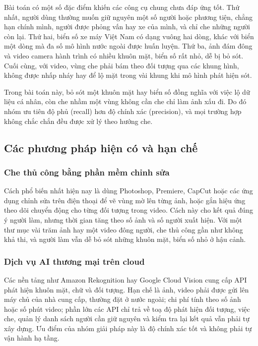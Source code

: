 \documentclass[a4paper,12pt]{article}
\begin{document}
Bài toán có một số đặc điểm khiến các công cụ chung chưa đáp ứng tốt. Thứ nhất, người dùng thường muốn giữ nguyên một số người hoặc phương tiện, chẳng hạn chính mình, người được phỏng vấn hay xe của mình, và chỉ che những người còn lại. Thứ hai, biển số xe máy Việt Nam có dạng vuông hai dòng, khác với biển một dòng mà đa số mô hình nước ngoài được huấn luyện. Thứ ba, ảnh đám đông và video camera hành trình có nhiều khuôn mặt, biển số rất nhỏ, dễ bị bỏ sót. Cuối cùng, với video, vùng che phải bám theo đối tượng qua các khung hình, không được nhấp nháy hay để lộ mặt trong vài khung khi mô hình phát hiện sót.

Trong bài toán này, bỏ sót một khuôn mặt hay biển số đồng nghĩa với việc lộ dữ liệu cá nhân, còn che nhầm một vùng không cần che chỉ làm ảnh xấu đi. Do đó nhóm ưu tiên độ phủ (recall) hơn độ chính xác (precision), và mọi trường hợp không chắc chắn đều được xử lý theo hướng che.


\subsection{Các phương pháp hiện có và hạn chế}


\subsubsection{Che thủ công bằng phần mềm chỉnh sửa}

Cách phổ biến nhất hiện nay là dùng Photoshop, Premiere, CapCut hoặc các ứng dụng chỉnh sửa trên điện thoại để vẽ vùng mờ lên từng ảnh, hoặc gắn hiệu ứng theo dõi chuyển động cho từng đối tượng trong video. Cách này cho kết quả đúng ý người làm, nhưng thời gian tăng theo số ảnh và số người xuất hiện. Với một thư mục vài trăm ảnh hay một video đông người, che thủ công gần như không khả thi, và người làm vẫn dễ bỏ sót những khuôn mặt, biển số nhỏ ở hậu cảnh.


\subsubsection{Dịch vụ AI thương mại trên cloud}

Các nền tảng như Amazon Rekognition hay Google Cloud Vision cung cấp API phát hiện khuôn mặt, chữ và đối tượng. Hạn chế là ảnh, video phải được gửi lên máy chủ của nhà cung cấp, thường đặt ở nước ngoài; chi phí tính theo số ảnh hoặc số phút video; phần lớn các API chỉ trả về toạ độ phát hiện đối tượng, việc che, quản lý danh sách người cần giữ nguyên và kiểm tra lại kết quả vẫn phải tự xây dựng. Ưu điểm của nhóm giải pháp này là độ chính xác tốt và không phải tự vận hành hạ tầng.
\end{document}
